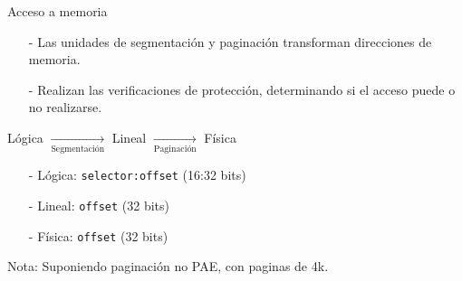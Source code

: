 \documentclass[aspectratio=169]{beamer}
\begin{document}
\begin{frame}{Acceso a memoria}
    \begin{itemize}
    \setlength\itemsep{0.3cm}
    \item[-] Las unidades de segmentación y paginación transforman direcciones de memoria. \pause
    \item[-] Realizan las verificaciones de protección, determinando si el acceso puede o no realizarse. \pause
    \end{itemize}
    \begin{center}
    \Large Lógica $\xrightarrow[\text{Segmentación}]{}$ Lineal $\xrightarrow[\text{Paginación}]{}$ Física
    \end{center}

    \begin{itemize}
    \setlength\itemsep{0.1cm}
    \item[-] Lógica: \textcolor{verdeuca}{\texttt{selector:offset}} (16:32 bits)
    \item[-] Lineal: \textcolor{verdeuca}{\texttt{offset}} (32 bits)
    \item[-] Física: \textcolor{verdeuca}{\texttt{offset}} (32 bits)
    \end{itemize}
    \vspace{0.7cm}
    \footnotesize Nota: Suponiendo paginación no PAE, con paginas de 4k.
\end{frame}
\end{document}
